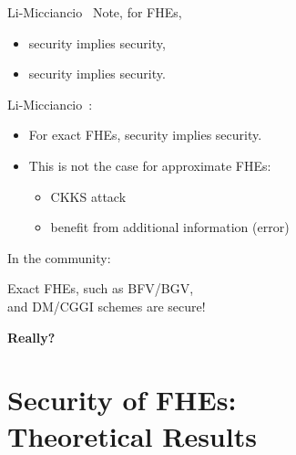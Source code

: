 \documentclass{beamer}
\begin{document}
    \begin{frame}{Li-Micciancio~\cite{EC:LiMic21}}
    \small
    Note, for FHEs,
        \begin{itemize}
            \item \indcpad security implies \indcpa security, 
            \item \indcpad security implies \krd security.
        \end{itemize}
    
	Li-Micciancio~\cite{EC:LiMic21}: 
    \begin{itemize}
        \item For exact FHEs, \indcpa security implies \indcpad security.
        \item This is not the case for approximate FHEs: 
        \begin{itemize}
            \item CKKS \krd attack
            \item benefit from additional information (error)
        \end{itemize}
    \end{itemize}

    In the community: 
    \begin{center}
        Exact FHEs, such as BFV/BGV,\\ and DM/CGGI schemes are \indcpad secure!
    \end{center}
    \end{frame}


\begin{frame}{}
\begin{center}
    {\Huge \bf Really?}
\end{center} 
\end{frame}

\section{\indcpad Security of FHEs:\\ {\normalsize Theoretical Results}}
\end{document}
